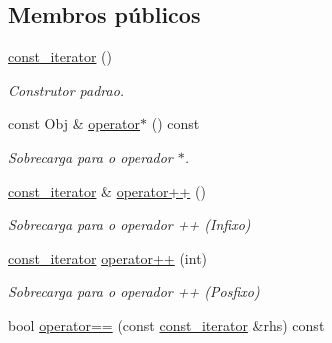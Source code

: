 \subsection*{Membros públicos}
\begin{DoxyCompactItemize}
\item 
\hyperlink{class_vector_1_1const__iterator_af954f0523c7ba74f7c88f86710df4cc6}{const\+\_\+iterator} ()\hypertarget{class_vector_1_1const__iterator_af954f0523c7ba74f7c88f86710df4cc6}{}\label{class_vector_1_1const__iterator_af954f0523c7ba74f7c88f86710df4cc6}

\begin{DoxyCompactList}\small\item\em Construtor padrao. \end{DoxyCompactList}\item 
const Obj \& \hyperlink{class_vector_1_1const__iterator_a33dc4eac4d02f61a73c3b456400064a1}{operator$\ast$} () const \hypertarget{class_vector_1_1const__iterator_a33dc4eac4d02f61a73c3b456400064a1}{}\label{class_vector_1_1const__iterator_a33dc4eac4d02f61a73c3b456400064a1}

\begin{DoxyCompactList}\small\item\em Sobrecarga para o operador $\ast$. \end{DoxyCompactList}\item 
\hyperlink{class_vector_1_1const__iterator}{const\+\_\+iterator} \& \hyperlink{class_vector_1_1const__iterator_adf1541d788766e7e857371642342bd54}{operator++} ()\hypertarget{class_vector_1_1const__iterator_adf1541d788766e7e857371642342bd54}{}\label{class_vector_1_1const__iterator_adf1541d788766e7e857371642342bd54}

\begin{DoxyCompactList}\small\item\em Sobrecarga para o operador ++ (Infixo) \end{DoxyCompactList}\item 
\hyperlink{class_vector_1_1const__iterator}{const\+\_\+iterator} \hyperlink{class_vector_1_1const__iterator_a598c3874b5f64f401650bcf108a6d953}{operator++} (int)\hypertarget{class_vector_1_1const__iterator_a598c3874b5f64f401650bcf108a6d953}{}\label{class_vector_1_1const__iterator_a598c3874b5f64f401650bcf108a6d953}

\begin{DoxyCompactList}\small\item\em Sobrecarga para o operador ++ (Posfixo) \end{DoxyCompactList}\item 
bool \hyperlink{class_vector_1_1const__iterator_a1eeb6debc8a581acb7a88d66ced8914c}{operator==} (const \hyperlink{class_vector_1_1const__iterator}{const\+\_\+iterator} \&rhs) const \hypertarget{class_vector_1_1const__iterator_a1eeb6debc8a581acb7a88d66ced8914c}{}\label{class_vector_1_1const__iterator_a1eeb6debc8a581acb7a88d66ced8914c}


\end{DoxyCompactItemize}
